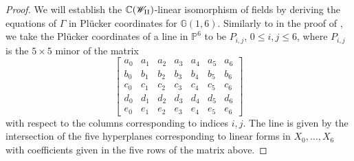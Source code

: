 \documentclass[a4paper,reqno]{amsart}
\numberwithin{equation}{section}
\newcommand{\C}{\mathbb{C}}
\newcommand{\p}{\mathbb{P}}
\numberwithin{equation}{section}
\begin{document}
\begin{proof}



We will establish the $\C(\mathscr{W}_{\rm{II}})$-linear isomorphism of fields by deriving the equations of $\Gamma$ in Pl\"ucker coordinates for $\mathbb{G}(1,6)$. 
Similarly to in the proof of , we take the Pl\"{u}cker coordinates of a line in $\p^6$ to be
$P_{i,j}$, $0\leq i,j\leq 6$, where $P_{i,j}$ is the $5\times5$ minor of the matrix 
$$\begin{bmatrix}
    a_0 & a_1 & a_2 & a_3 & a_4 & a_5 &a_6\\
b_0 & b_1 & b_2 & b_3 & b_4 & b_5 &b_6 \\
c_0 & c_1 & c_2 & c_3 & c_4  & c_5 &c_6 \\
d_0 & d_1 & d_2 & d_3 & d_4  & d_5 &d_6 \\
e_0 & e_1 & e_2 & e_3 & e_4  & e_5 &e_6 
\end{bmatrix}
$$
with respect to the columns corresponding to indices $i,j$.
The line is given by the intersection of the five hyperplanes corresponding to linear forms in $X_0,\dots,X_6$ with coefficients given in the five rows of the matrix above.


\end{proof}
\end{document}
